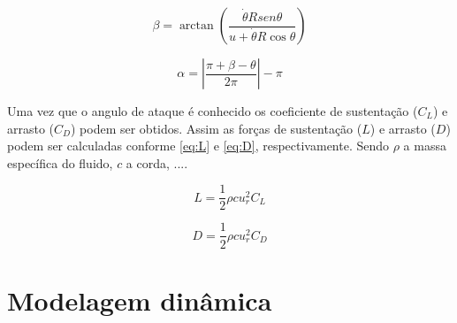 \begin{equation}
\beta  = \arctan \left( {\frac{{\dot \theta Rsen\theta }}{{u + \dot \theta R\cos \theta }}} \right)
\label{eq:beta}
\end{equation}

\begin{equation}
\alpha  = \left| {\frac{{\pi  + \beta  - \theta }}{{2\pi }}} \right| - \pi
\label{eq:alfa}
\end{equation}

Uma vez que o angulo de ataque é conhecido os coeficiente de sustentação ($C_L$) e arrasto ($C_D$) podem ser obtidos. Assim as forças de sustentação ($L$) e arrasto ($D$) podem ser calculadas conforme \autoref{eq:L} e \autoref{eq:D}, respectivamente. Sendo $\rho$ a massa específica do fluido, $c$ a corda, ....

\begin{equation}
L = \frac{1}{2}\rho cu_r^2{C_L}
\label{eq:L}
\end{equation}

\begin{equation}
D = \frac{1}{2}\rho cu_r^2{C_D}
\label{eq:D}
\end{equation}


\section{Modelagem dinâmica}
\label{sec:modelagemdinamica}

